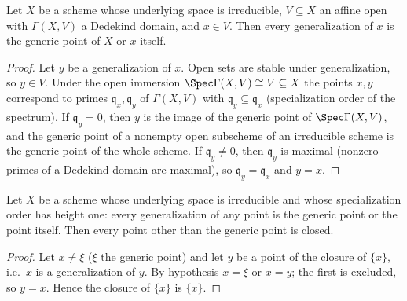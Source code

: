 \begin{theorem}
  \label{thm:affine_dedekind_specializes}
  \leanok
  Let \(X\) be a scheme whose underlying space is irreducible, \(V \subseteq X\) an affine
  open with \(\Gamma(X, V)\) a Dedekind domain, and \(x \in V\). Then every generalization
  of \(x\) is the generic point of \(X\) or \(x\) itself.
\end{theorem}
\begin{proof}
  \leanok
  Let \(y\) be a generalization of \(x\). Open sets are stable under generalization, so
  \(y \in V\). Under the open immersion \(\Spec \Gamma(X, V) \cong V \subseteq X\) the
  points \(x, y\) correspond to primes \(\mathfrak q_x, \mathfrak q_y\) of
  \(\Gamma(X, V)\) with \(\mathfrak q_y \subseteq \mathfrak q_x\) (specialization order of
  the spectrum). If \(\mathfrak q_y = 0\), then \(y\) is the image of the generic point of
  \(\Spec \Gamma(X, V)\), and the generic point of a nonempty open subscheme of an
  irreducible scheme is the generic point of the whole scheme. If \(\mathfrak q_y \neq 0\),
  then \(\mathfrak q_y\) is maximal (nonzero primes of a Dedekind domain are maximal), so
  \(\mathfrak q_y = \mathfrak q_x\) and \(y = x\).
\end{proof}

\begin{lemma}
  \label{lem:height_one_closed_points}
  \leanok
  Let \(X\) be a scheme whose underlying space is irreducible and whose specialization
  order has height one: every generalization of any point is the generic point or the
  point itself. Then every point other than the generic point is closed.
\end{lemma}
\begin{proof}
  \leanok
  Let \(x \neq \xi\) (\(\xi\) the generic point) and let \(y\) be a point of the closure of
  \(\{x\}\), i.e.\ \(x\) is a generalization of \(y\). By hypothesis \(x = \xi\) or
  \(x = y\); the first is excluded, so \(y = x\). Hence the closure of \(\{x\}\) is
  \(\{x\}\).
\end{proof}

